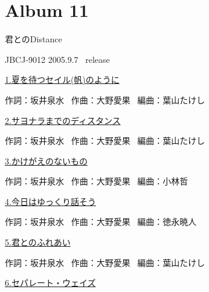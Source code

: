 
\chapter{Album 11}
\thispagestyle{empty} %
\vspace{-16mm}
\LARGE {君とのDistance}

\normalsize{JBCJ-9012 2005.9.7 \ release}
\\

\vspace{-5mm}


\small{\hyperlink{11_0}{1.夏を待つセイル(帆)のように}}

\tiny{作詞：坂井泉水 \ 作曲：大野愛果 \ 編曲：葉山たけし}

\small{\hyperlink{11_1}{2.サヨナラまでのディスタンス}}

\tiny{作詞：坂井泉水 \ 作曲：大野愛果 \ 編曲：葉山たけし}

\small{\hyperlink{11_2}{3.かけがえのないもの}}

\tiny{作詞：坂井泉水 \ 作曲：大野愛果 \ 編曲：小林哲}

\small{\hyperlink{11_3}{4.今日はゆっくり話そう}}

\tiny{作詞：坂井泉水 \ 作曲：大野愛果 \ 編曲：徳永暁人}

\small{\hyperlink{11_4}{5.君とのふれあい}}

\tiny{作詞：坂井泉水 \ 作曲：大野愛果 \ 編曲：葉山たけし}

\small{\hyperlink{11_5}{6.セパレート・ウェイズ}}

